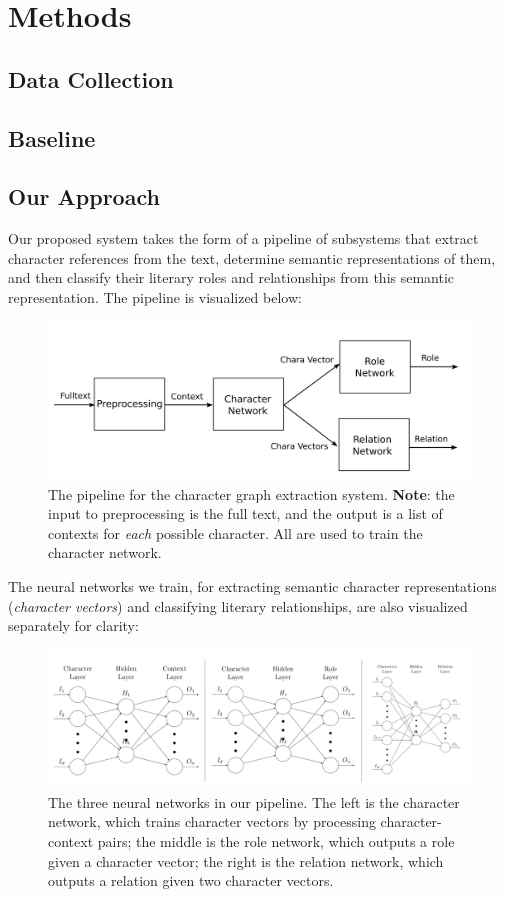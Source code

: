 \documentclass[12pt]{article}
\begin{document}
\section{Methods}
\subsection{Data Collection}
\subsection{Baseline}
\subsection{Our Approach}
    Our proposed system takes the form of a pipeline of subsystems that extract character references from the text, determine semantic representations of them, and then classify their literary roles and relationships from this semantic representation. The pipeline is visualized below: 
    
    \begin{figure}[H]
        \centering
        \includegraphics[width=6in]{pipeline.png}
        \caption{The pipeline for the character graph extraction system. \textbf{Note}: the input to preprocessing is the full text, and the output is a list of contexts for \emph{each} possible character. All are used to train the character network.} 
    \end{figure}

    The neural networks we train, for extracting semantic character representations (\emph{character vectors}) and classifying literary relationships, are also visualized separately for clarity: \\ 

    \begin{figure}[H]
        \centering
        \includegraphics[width=7in]{networks.png}
        \caption{The three neural networks in our pipeline. The left is the character network, which trains character vectors by processing character-context pairs; the middle is the role network, which outputs a role given a character vector; the right is the relation network, which outputs a relation given two character vectors.}
    \end{figure}
    
\end{document}
